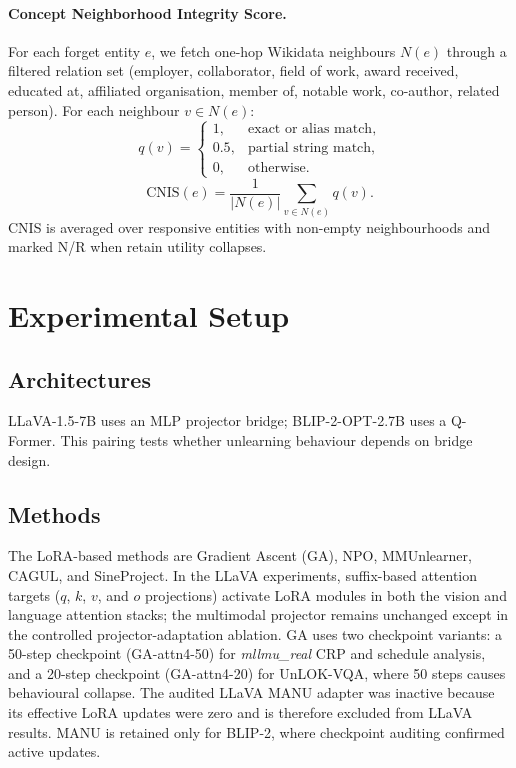 \documentclass[letterpaper]{article}
\begin{document}
\paragraph{Concept Neighborhood Integrity Score.}
For each forget entity $e$, we fetch one-hop Wikidata neighbours
$N(e)$ \citep{vrandevcic2014wikidata} through a filtered relation set
(employer, collaborator, field of work, award received, educated at,
affiliated organisation, member of, notable work, co-author, related person).
For each neighbour $v\in N(e)$:
\begin{equation}
q(v)=
\begin{cases}
1,   & \text{exact or alias match},\\
0.5, & \text{partial string match},\\
0,   & \text{otherwise}.
\end{cases}
\end{equation}
\begin{equation}
\mathrm{CNIS}(e)=\frac{1}{|N(e)|}\sum_{v\in N(e)}q(v).
\end{equation}
CNIS is averaged over responsive entities with non-empty neighbourhoods and
marked N/R when retain utility collapses.

\section{Experimental Setup}

\subsection{Architectures}
LLaVA-1.5-7B \citep{liu2023llava} uses an MLP projector bridge;
BLIP-2-OPT-2.7B \citep{li2023blip2} uses a Q-Former. This pairing tests
whether unlearning behaviour depends on bridge design.

\subsection{Methods}
The LoRA-based methods are Gradient Ascent (GA), NPO, MMUnlearner, CAGUL,
and SineProject. In the LLaVA experiments, suffix-based attention targets
($q$, $k$, $v$, and $o$ projections) activate LoRA modules in both the
vision and language attention stacks; the multimodal projector remains
unchanged except in the controlled projector-adaptation ablation. GA uses
two checkpoint variants: a 50-step checkpoint (GA-attn4-50) for
\emph{mllmu\_real} CRP and schedule analysis, and a 20-step checkpoint
(GA-attn4-20) for UnLOK-VQA, where 50 steps causes behavioural collapse.
The audited LLaVA MANU adapter was inactive because its effective LoRA
updates were zero and is therefore excluded from LLaVA results. MANU is
retained only for BLIP-2, where checkpoint auditing confirmed active
updates.
\end{document}
